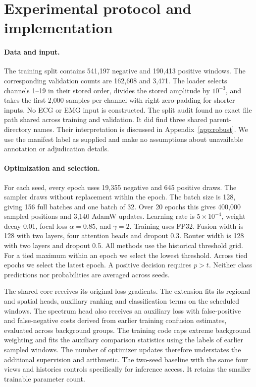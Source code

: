 \section{Experimental protocol and implementation}\label{app:protocol}
\paragraph{Data and input.}
The training split contains 541,197 negative and 190,413 positive windows. The corresponding validation counts are 162,608 and 3,471. The loader selects channels 1--19 in their stored order, divides the stored amplitude by $10^{-3}$, and takes the first 2,000 samples per channel with right zero-padding for shorter inputs. No ECG or EMG input is constructed. The split audit found no exact file path shared across training and validation. It did find three shared parent-directory names. Their interpretation is discussed in Appendix~\ref{app:robust}. We use the manifest label as supplied and make no assumptions about unavailable annotation or adjudication details.

\paragraph{Optimization and selection.}
For each seed, every epoch uses 19,355 negative and 645 positive draws. The sampler draws without replacement within the epoch. The batch size is 128, giving 156 full batches and one batch of 32. Over 20 epochs this gives 400,000 sampled positions and 3,140 AdamW updates. Learning rate is $5\times10^{-4}$, weight decay 0.01, focal-loss $\alpha=0.85$, and $\gamma=2$. Training uses FP32. Fusion width is 128 with two layers, four attention heads and dropout 0.3. Router width is 128 with two layers and dropout 0.5. All methods use the historical threshold grid. For a tied maximum within an epoch we select the lowest threshold. Across tied epochs we select the latest epoch. A positive decision requires $p>t$. Neither class predictions nor probabilities are averaged across seeds.

The shared core receives its original loss gradients. The extension fits its regional and spatial heads, auxiliary ranking and classification terms on the scheduled windows. The spectrum head also receives an auxiliary loss with false-positive and false-negative costs derived from earlier training confusion estimates, evaluated across background groups. The training code caps extreme background weighting and fits the auxiliary comparison statistics using the labels of earlier sampled windows. The number of optimizer updates therefore understates the additional supervision and arithmetic. The two-seed baseline with the same four views and histories controls specifically for inference access. It retains the smaller trainable parameter count.

